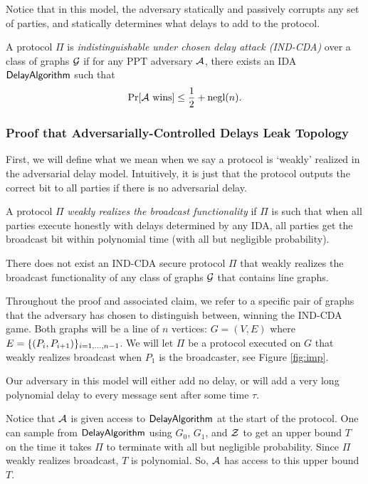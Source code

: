 Notice that in this model, the adversary statically and passively corrupts any set of parties, and statically determines what delays to add to the protocol.

\begin{definition}
	A protocol $\Pi$ is \emph{indistinguishable under chosen delay attack (IND-CDA)} over a class of graphs $\mathcal{G}$ if for any PPT adversary $\mathcal{A}$, there exists an IDA $\mathsf{DelayAlgorithm}$ such that
	\[ \Pr[\mathcal{A} \mbox{ wins}]  \leq \frac 1 2 + \text{negl}(n). \]
\end{definition}

\subsubsection{Proof that Adversarially-Controlled Delays Leak Topology}
First, we will define what we mean when we say a protocol is `weakly' realized in the adversarial delay model. Intuitively, it is just that the protocol outputs the correct bit to all parties if there is no adversarial delay.

\begin{definition}
	A protocol $\Pi$ \emph{weakly realizes the broadcast functionality} if $\Pi$ is such that when all parties execute honestly with delays determined by any IDA, all parties get the broadcast bit within polynomial time (with all but negligible probability).
\end{definition}


\begin{theorem}\label{thm:impossibility}
	There does not exist an IND-CDA secure protocol $\Pi$ that weakly realizes the broadcast functionality of any class of graphs $\mathcal{G}$ that contains line graphs.
\end{theorem}

Throughout the proof and associated claim, we refer to a specific pair of graphs that the adversary has chosen to distinguish between, winning the IND-CDA game. Both graphs will be a line of $n$ vertices: $G = (V,E)$ where $E = \{(P_i, P_{i+1})\}_{i=1,\ldots,n-1}$. We will let $\Pi$ be a protocol executed on $G$ that weakly realizes broadcast when $P_1$ is the broadcaster, see Figure \ref{fig:imp}.

Our adversary in this model will either add no delay, or will add a very long polynomial delay to every message sent after some time $\tau$.

Notice that $\mathcal{A}$ is given access to $\mathsf{DelayAlgorithm}$ at the start of the protocol. One can sample from $\mathsf{DelayAlgorithm}$ using $G_0$, $G_1$, and $\mathcal{Z}$ to get an upper bound $T$ on the time it takes $\Pi$ to terminate with all but negligible probability. Since $\Pi$ weakly realizes broadcast, $T$ is polynomial. So, $\mathcal{A}$ has access to this upper bound $T$.


